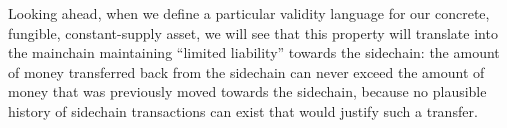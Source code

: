 Looking ahead, when we define a particular validity language for our concrete,
fungible, constant-supply asset, we will see that this property will translate
into the mainchain maintaining ``limited liability'' towards the sidechain: the
amount of money transferred back from the sidechain can never exceed the amount
of money that was previously moved towards the sidechain, because no plausible
history of sidechain transactions can exist that would justify such a transfer.
